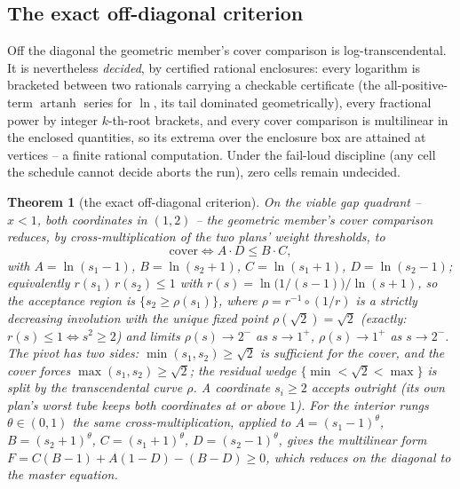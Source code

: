 \documentclass[preprint,11pt,authoryear]{elsarticle}
\newtheorem{theorem}{Theorem}
\theoremstyle{remark}
\begin{document}
\subsection{The exact off-diagonal criterion}

Off the diagonal the geometric member's cover comparison is log-transcendental. It is nevertheless \emph{decided}, by certified rational enclosures: every logarithm is bracketed between two rationals carrying a checkable certificate (the all-positive-term $\operatorname{artanh}$ series for $\ln$, its tail dominated geometrically), every fractional power by integer $k$-th-root brackets, and every cover comparison is multilinear in the enclosed quantities, so its extrema over the enclosure box are attained at vertices -- a finite rational computation. Under the fail-loud discipline (any cell the schedule cannot decide aborts the run), zero cells remain undecided.

\begin{theorem}[the exact off-diagonal criterion]\label{thm:offdiag}
On the viable gap quadrant -- $x<1$, both coordinates in $(1,2)$ -- the geometric member's cover comparison reduces, by cross-multiplication of the two plans' weight thresholds, to
\[
\mathrm{cover}\iff A\cdot D\le B\cdot C,
\]
with $A=\ln(s_1-1)$, $B=\ln(s_2+1)$, $C=\ln(s_1+1)$, $D=\ln(s_2-1)$;
equivalently $r(s_1)\,r(s_2)\le1$ with $r(s)=\ln\!\big(1/(s-1)\big)/\ln(s+1)$, so the acceptance region is $\{s_2\ge\rho(s_1)\}$, where $\rho=r^{-1}\circ(1/r)$ is a strictly decreasing involution with the unique fixed point $\rho(\sqrt2)=\sqrt2$ (exactly: $r(s)\le1\iff s^2\ge2$) and limits $\rho(s)\to2^-$ as $s\to1^+$, $\rho(s)\to1^+$ as $s\to2^-$. The pivot has two sides: $\min(s_1,s_2)\ge\sqrt2$ is sufficient for the cover, and the cover forces $\max(s_1,s_2)\ge\sqrt2$; the residual wedge $\{\min<\sqrt2<\max\}$ is split by the transcendental curve $\rho$. A coordinate $s_i\ge2$ accepts outright (its own plan's worst tube keeps both coordinates at or above $1$). For the interior rungs $\theta\in(0,1)$ the same cross-multiplication, applied to $A=(s_1-1)^\theta$, $B=(s_2+1)^\theta$, $C=(s_1+1)^\theta$, $D=(s_2-1)^\theta$, gives the multilinear form $F=C(B-1)+A(1-D)-(B-D)\ge0$, which reduces on the diagonal to the master equation.
\end{theorem}
\end{document}
